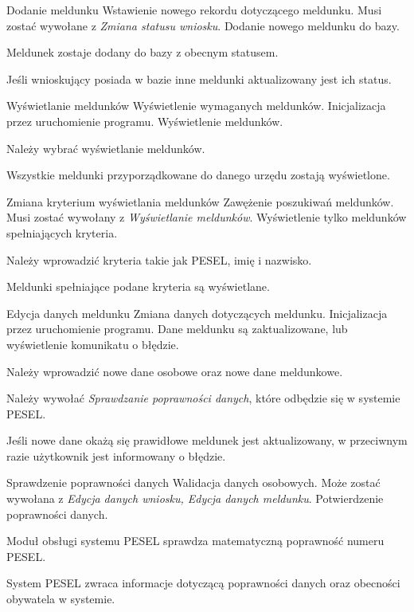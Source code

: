 \documentclass[12pt]{article}
\begin{document}
\scenario
    {Dodanie meldunku}
    {Wstawienie nowego rekordu dotyczącego meldunku.}
    {Musi zostać wywołane z \textit{Zmiana statusu wniosku}.}
    {Dodanie nowego meldunku do bazy.}
    {
        \item Meldunek zostaje dodany do bazy z obecnym statusem.
        \item Jeśli wnioskujący posiada w bazie inne meldunki aktualizowany jest ich status.
    }
    \scenario
    {Wyświetlanie meldunków}
    {Wyświetlenie wymaganych meldunków.}
    {Inicjalizacja przez uruchomienie programu.}
    {Wyświetlenie meldunków.}
    {
        \item Należy wybrać wyświetlanie meldunków.
        \item Wszystkie meldunki przyporządkowane do danego urzędu zostają wyświetlone.
    }
\scenario
    {Zmiana kryterium wyświetlania meldunków}
    {Zawężenie poszukiwań meldunków.}
    {Musi zostać wywołany z \textit{Wyświetlanie meldunków}.}
    {Wyświetlenie tylko meldunków spełniających kryteria.}
    {
        \item Należy wprowadzić kryteria takie jak PESEL, imię i nazwisko.
        \item Meldunki spełniające podane kryteria są wyświetlane.
    }
\scenario
    {Edycja danych meldunku}
    {Zmiana danych dotyczących meldunku.}
    {Inicjalizacja przez uruchomienie programu.}
    {Dane meldunku są zaktualizowane, lub wyświetlenie komunikatu o błędzie.}
    {
        \item Należy wprowadzić nowe dane osobowe oraz nowe dane meldunkowe.
        \item Należy wywołać \textit{Sprawdzanie poprawności danych}, które odbędzie się w systemie PESEL.
        \item Jeśli nowe dane okażą się prawidłowe meldunek jest aktualizowany, w przeciwnym razie użytkownik jest informowany o błędzie.
    }
\scenario
    {Sprawdzenie poprawności danych}
    {Walidacja danych osobowych.}
    {Może zostać wywołana z \textit{Edycja danych wniosku, Edycja danych meldunku}.}
    {Potwierdzenie poprawności danych.}
    {
        \item Moduł obsługi systemu PESEL sprawdza matematyczną poprawność numeru PESEL.
        \item System PESEL zwraca informacje dotyczącą poprawności danych oraz obecności obywatela w systemie.
    }
\end{document}

